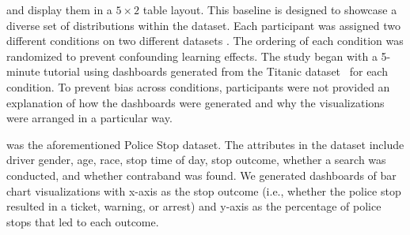 and display them in a $5\times2$ table layout.
This baseline is designed to showcase a diverse set of
distributions within the dataset.
\smallskip
{}
Each participant was assigned two different
conditions on two different datasets
.
The ordering of each condition was
randomized to prevent confounding learning effects.
The study began with a 5-minute tutorial
using dashboards generated from the Titanic dataset~\cite{titanic}
for each condition.
To prevent bias across conditions,
participants were not provided an explanation of
how the dashboards were generated and
why the visualizations were arranged in a particular way.

 was the aforementioned
Police Stop dataset.
The attributes in the dataset
include driver gender, age, race, stop time of day,
stop outcome, whether a search was conducted,
and whether contraband was found.
We generated dashboards of bar chart visualizations
with x-axis as the stop outcome
(i.e., whether the police stop resulted in a
ticket, warning, or arrest) and y-axis as the percentage of police stops that led to each outcome. %

